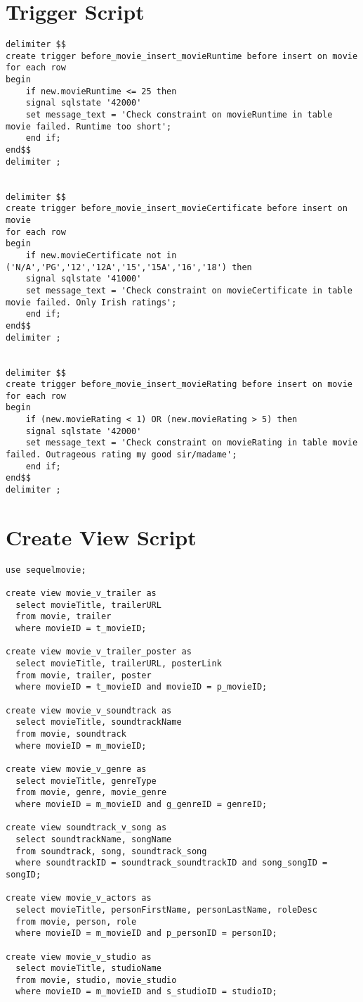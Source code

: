 \documentclass[12pt]{article}
\begin{document}
\section{Trigger Script}
\begin{lstlisting}
delimiter $$
create trigger before_movie_insert_movieRuntime before insert on movie
for each row
begin
	if new.movieRuntime <= 25 then
	signal sqlstate '42000'
	set message_text = 'Check constraint on movieRuntime in table movie failed. Runtime too short';
	end if;
end$$
delimiter ;


delimiter $$
create trigger before_movie_insert_movieCertificate before insert on movie
for each row
begin
	if new.movieCertificate not in ('N/A','PG','12','12A','15','15A','16','18') then
    signal sqlstate '41000'
    set message_text = 'Check constraint on movieCertificate in table movie failed. Only Irish ratings';
    end if;
end$$
delimiter ;


delimiter $$
create trigger before_movie_insert_movieRating before insert on movie
for each row
begin
	if (new.movieRating < 1) OR (new.movieRating > 5) then
	signal sqlstate '42000'
	set message_text = 'Check constraint on movieRating in table movie failed. Outrageous rating my good sir/madame';
	end if;
end$$
delimiter ;

\end{lstlisting}
\newpage
\section{Create View Script}
\begin{lstlisting}
use sequelmovie;

create view movie_v_trailer as
  select movieTitle, trailerURL
  from movie, trailer
  where movieID = t_movieID;

create view movie_v_trailer_poster as
  select movieTitle, trailerURL, posterLink
  from movie, trailer, poster
  where movieID = t_movieID and movieID = p_movieID;

create view movie_v_soundtrack as
  select movieTitle, soundtrackName
  from movie, soundtrack
  where movieID = m_movieID;

create view movie_v_genre as
  select movieTitle, genreType
  from movie, genre, movie_genre
  where movieID = m_movieID and g_genreID = genreID;

create view soundtrack_v_song as
  select soundtrackName, songName
  from soundtrack, song, soundtrack_song
  where soundtrackID = soundtrack_soundtrackID and song_songID = songID;

create view movie_v_actors as
  select movieTitle, personFirstName, personLastName, roleDesc
  from movie, person, role
  where movieID = m_movieID and p_personID = personID;

create view movie_v_studio as
  select movieTitle, studioName
  from movie, studio, movie_studio
  where movieID = m_movieID and s_studioID = studioID;

\end{lstlisting}
\end{document}
